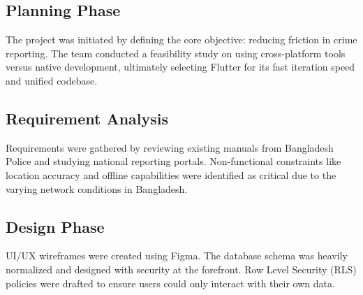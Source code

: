 \documentclass[12pt, a4paper, twoside]{report}
\begin{document}
\subsection{Planning Phase}
The project was initiated by defining the core objective: reducing friction in crime reporting. The team conducted a feasibility study on using cross-platform tools versus native development, ultimately selecting Flutter for its fast iteration speed and unified codebase.

\subsection{Requirement Analysis}
Requirements were gathered by reviewing existing manuals from Bangladesh Police and studying national reporting portals. Non-functional constraints like location accuracy and offline capabilities were identified as critical due to the varying network conditions in Bangladesh.

\subsection{Design Phase}
UI/UX wireframes were created using Figma. The database schema was heavily normalized and designed with security at the forefront. Row Level Security (RLS) policies were drafted to ensure users could only interact with their own data.
\end{document}
